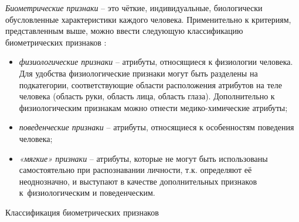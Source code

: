 \documentclass[12pt]{book}
\begin{document}
\large{\textit{Биометрические признаки} -- это чёткие, индивидуальные, биологически обусловленные характеристики каждого человека. Применительно к критериям, представленным выше, можно ввести следующую классификацию биометрических признаков \cite{unar_2014}:

\begin{itemize}[topsep=1pt] \itemsep0.1em
\item \textit{физиологические признаки} -- атрибуты, относящиеся к физиологии человека. Для удобства физиологические признаки могут быть разделены на подкатегории, соответствующие области расположения атрибутов на теле человека (область руки, область лица, область глаза). Дополнительно к физиологическим признакам можно отнести медико-химические атрибуты;
\item \textit{поведенческие признаки} -- атрибуты, относящиеся к особенностям поведения человека;
\item \textit{«мягкие» признаки} -- атрибуты, которые не могут быть использованы самостоятельно при распознавании личности, т.к. определяют её неоднозначно, и выступают в качестве дополнительных признаков к~физиологическим и поведенческим.
\end{itemize}

\begin{table}[h]
\centering
\caption{\label{tab:table_1_1}Классификация биометрических признаков}


\end{table}}
\end{document}
